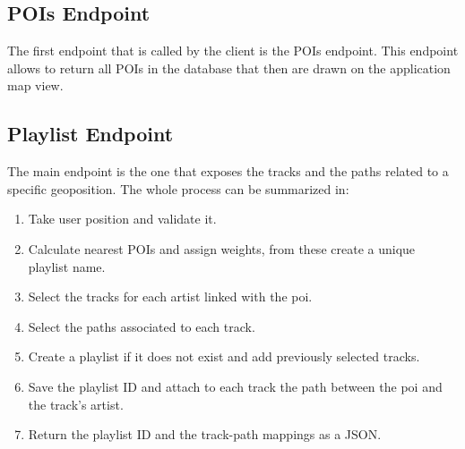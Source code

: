\documentclass[paper=a4, fontsize=11pt]{scrartcl}
\begin{document}
\subsection{POIs Endpoint}
The first endpoint that is called by the client is the POIs endpoint.
This endpoint allows to return all POIs in the database that then are drawn on the application map view.
\subsection{Playlist Endpoint}
The main endpoint is the one that exposes the tracks and the paths related to a specific geoposition.
The whole process can be summarized in:
\begin{enumerate}
\item Take user position and validate it.
\item Calculate nearest POIs and assign weights, from these create a unique playlist name.
\item Select the tracks for each artist linked with the poi.
\item Select the paths associated to each track.
\item Create a playlist if it does not exist and add previously selected tracks.
\item Save the playlist ID and attach to each track the path between the poi and the track's artist.
\item Return the playlist ID and the track-path mappings as a JSON.
\end{enumerate}

\newcommand*\circled[1]{\tikz[baseline=(char.base)]{
    \node[shape=circle,draw,inner sep=2pt] (char) {#1};}}
\end{document}
